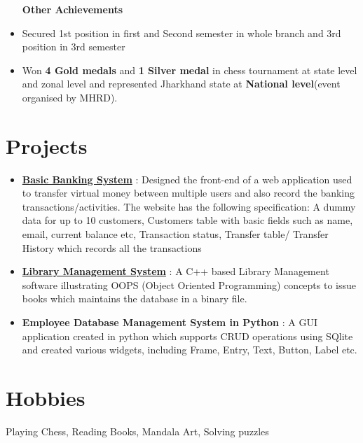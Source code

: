 \documentclass[margin, centered]{res}
\begin{document}
\begin{resume}
\begin{itemize}[leftmargin=*]
 
 \textbf{Other Achievements}
 \item Secured 1st position in first and Second semester in whole branch and 3rd position in 3rd semester
 \item Won \textbf{4 Gold medals} and \textbf{1 Silver medal} in chess tournament at state level and zonal level and represented Jharkhand state at \textbf{National level}(event organised by MHRD).
\end{itemize}
\section{Projects}
\begin{itemize}[leftmargin=*]
 \item \textbf{\href{https://github.com/tannuchoudhary/basic_banking_system}{Basic Banking System}} : Designed the front-end of a web application used to transfer virtual money between multiple users and also record the banking transactions/activities. The website has the following specification: A dummy data for up to 10 customers, Customers table with basic fields such as name, email, current balance etc, Transaction status, Transfer table/ Transfer History which records all the transactions
 \item \textbf{\href{https://github.com/tannuchoudhary/Library-Management-System}{Library Management System}} : A C++ based Library Management software illustrating OOPS (Object Oriented Programming) concepts to issue books which maintains the database in a binary file.
 \item \textbf{Employee Database Management System in Python} : A GUI application created in python which supports CRUD operations using SQlite and created various widgets, including Frame, Entry, Text, Button, Label etc.
 
\end{itemize}



\section{Hobbies}
Playing Chess, Reading Books, Mandala Art, Solving puzzles


\end{resume}
\end{document}
